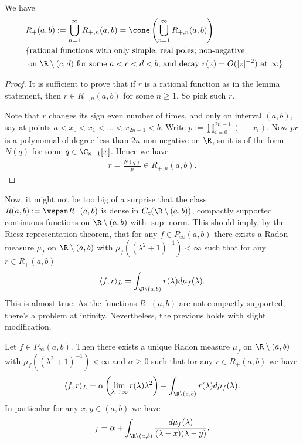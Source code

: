 \begin{lem}
	We have
	\begin{align*}
		&R_{+}(a, b) := \bigcup_{n = 1}^{\infty} R_{+, n}(a, b) = \cone\left( \bigcup_{n = 1}^{\infty} R_{+, n}(a, b)\right) \\
		= &\{ \text{rational functions with only simple, real poles; non-negative} \\
		& \text{ on $\R \setminus (c, d)$ for some $a < c < d < b$; and decay $r(z) = O(|z|^{-2})$ at $\infty$} \}.
	\end{align*}
\end{lem}
\begin{proof}
	It is sufficient to prove that if $r$ is a rational function as in the lemma statement, then $r \in R_{+, n}(a, b)$ for some $n \geq 1$. So pick such $r$.

	Note that $r$ changes its sign even number of times, and only on interval $(a, b)$, say at points $a < x_{0} < x_{1} < \ldots < x_{2 n - 1} < b$. Write $p := \prod_{i = 0}^{2 n - 1} (\cdot - x_{i})$. Now $p r$ is a polynomial of degree less than $2 n$ non-negative on $\R$, so it is of the form $N(q)$ for some $q \in \C_{n - 1}[x]$. Hence we have
	\begin{align*}
		r = \frac{N(q)}{p} \in R_{+, n}(a, b).
	\end{align*}
\end{proof}

Now, it might not be too big of a surprise that the class $R(a, b) := \vspan R_{+}(a, b)$ is dense in $C_{c}(\R \setminus (a, b))$, compactly supported continuous functions on $\R \setminus (a, b)$ with $\sup$-norm. This should imply, by the Riesz representation theorem, that for any $f \in P_{\infty}(a, b)$ there exists a Radon measure $\mu_{f}$ on $\R \setminus (a, b)$ with $\mu_{f}((\lambda^2 + 1)^{-1}) < \infty$ such that for any $r \in R_{+}(a, b)$
\begin{align*}
	\langle f, r \rangle_{L} = \int_{\R \setminus (a, b)} r(\lambda) d \mu_{f}(\lambda).
\end{align*}
This is almost true. As the functions $R_{+}(a, b)$ are not compactly supported, there's a problem at infinity.  Nevertheless, the previous holds with slight modification.

\begin{lause}\label{integral_loewner}
	Let $f \in P_{\infty}(a, b)$. Then there exists a unique Radon measure $\mu_{f}$ on $\R \setminus (a, b)$ with $\mu_{f}((\lambda^2 + 1)^{-1}) < \infty$ and $\alpha \geq 0$ such that for any $r \in R_{+}(a, b)$ we have
	\begin{align*}
		\langle f, r \rangle_{L} = \alpha \left(\lim_{\lambda \to \infty} r(\lambda) \lambda^2 \right) + \int_{\R \setminus (a, b)} r(\lambda) d \mu_{f}(\lambda).
	\end{align*}
	In particular for any $x,y \in (a, b)$ we have
	\begin{align*}
		[x, y]_{f} = \alpha + \int_{\R \setminus (a, b)} \frac{d \mu_{f}(\lambda)}{(\lambda - x) (\lambda - y)}.
	\end{align*}
\end{lause}

